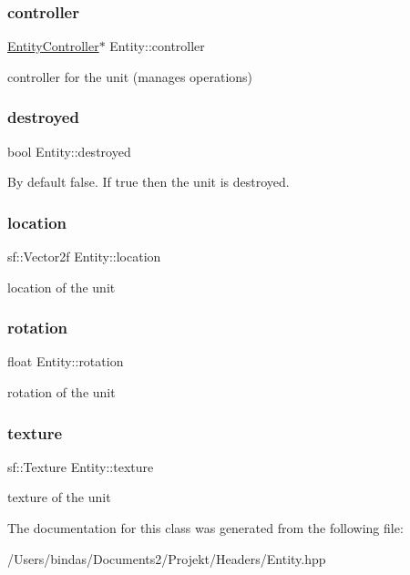 \subsubsection{\texorpdfstring{controller}{controller}}
{\footnotesize\ttfamily \mbox{\hyperlink{class_entity_controller}{Entity\+Controller}}$\ast$ Entity\+::controller\hspace{0.3cm}{\ttfamily [protected]}}

controller for the unit (manages operations) \mbox{\label{class_entity_a0ff0afc330fd03bb82e596dae58a6210}} 
\subsubsection{\texorpdfstring{destroyed}{destroyed}}
{\footnotesize\ttfamily bool Entity\+::destroyed\hspace{0.3cm}{\ttfamily [protected]}}

By default false. If true then the unit is destroyed. \mbox{\label{class_entity_a5b94ee2356d46ca6852e2807c3701133}} 
\subsubsection{\texorpdfstring{location}{location}}
{\footnotesize\ttfamily sf\+::\+Vector2f Entity\+::location\hspace{0.3cm}{\ttfamily [protected]}}

location of the unit \mbox{\label{class_entity_aa384ccfdaba36b1ff5f5db51ec3cdcb1}} 
\subsubsection{\texorpdfstring{rotation}{rotation}}
{\footnotesize\ttfamily float Entity\+::rotation\hspace{0.3cm}{\ttfamily [protected]}}

rotation of the unit \mbox{\label{class_entity_ad64dd6d282432a68475f30f7c7bbdc88}} 
\subsubsection{\texorpdfstring{texture}{texture}}
{\footnotesize\ttfamily sf\+::\+Texture Entity\+::texture\hspace{0.3cm}{\ttfamily [protected]}}

texture of the unit 

The documentation for this class was generated from the following file\+:\begin{DoxyCompactItemize}
\item 
/\+Users/bindas/\+Documents2/\+Projekt/\+Headers/Entity.\+hpp\end{DoxyCompactItemize}
